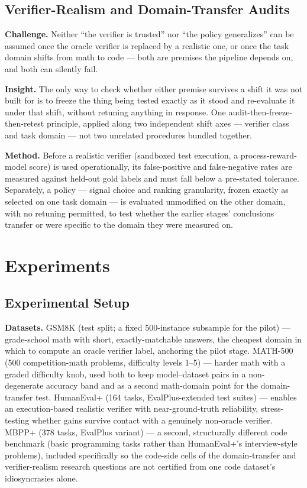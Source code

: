 \documentclass[11pt]{article}
\begin{document}
\subsection{Verifier-Realism and Domain-Transfer Audits}
\textbf{Challenge.} Neither ``the verifier is trusted'' nor ``the policy generalizes'' can be assumed once the oracle verifier is replaced by a realistic one, or once the task domain shifts from math to code --- both are premises the pipeline depends on, and both can silently fail.

\textbf{Insight.} The only way to check whether either premise survives a shift it was not built for is to freeze the thing being tested exactly as it stood and re-evaluate it under that shift, without retuning anything in response. One audit-then-freeze-then-retest principle, applied along two independent shift axes --- verifier class and task domain --- not two unrelated procedures bundled together.

\textbf{Method.} Before a realistic verifier (sandboxed test execution, a process-reward-model score) is used operationally, its false-positive and false-negative rates are measured against held-out gold labels and must fall below a pre-stated tolerance. Separately, a policy --- signal choice and ranking granularity, frozen exactly as selected on one task domain --- is evaluated unmodified on the other domain, with no retuning permitted, to test whether the earlier stages' conclusions transfer or were specific to the domain they were measured on.

\section{Experiments}

\subsection{Experimental Setup}

\textbf{Datasets.} GSM8K (test split; a fixed 500-instance subsample for the pilot) --- grade-school math with short, exactly-matchable answers, the cheapest domain in which to compute an oracle verifier label, anchoring the pilot stage. MATH-500 (500 competition-math problems, difficulty levels 1--5) --- harder math with a graded difficulty knob, used both to keep model--dataset pairs in a non-degenerate accuracy band and as a second math-domain point for the domain-transfer test. HumanEval+ (164 tasks, EvalPlus-extended test suites) --- enables an execution-based realistic verifier with near-ground-truth reliability, stress-testing whether gains survive contact with a genuinely non-oracle verifier. MBPP+ (378 tasks, EvalPlus variant) --- a second, structurally different code benchmark (basic programming tasks rather than HumanEval+'s interview-style problems), included specifically so the code-side cells of the domain-transfer and verifier-realism research questions are not certified from one code dataset's idiosyncrasies alone.
\end{document}
